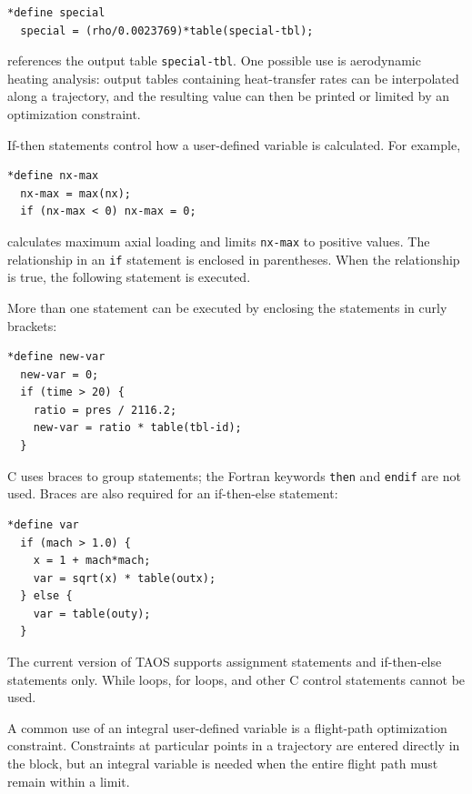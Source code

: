 \begin{lstlisting}[style=taosmanual]
*define special
  special = (rho/0.0023769)*table(special-tbl);
\end{lstlisting}

references the output table \texttt{special-tbl}. One possible use is aerodynamic
heating analysis: output tables containing heat-transfer rates can be interpolated
along a trajectory, and the resulting value can then be printed or limited by an
optimization constraint.

If-then statements control how a user-defined variable is calculated. For example,

\begin{lstlisting}[style=taosmanual]
*define nx-max
  nx-max = max(nx);
  if (nx-max < 0) nx-max = 0;
\end{lstlisting}

calculates maximum axial loading and limits \texttt{nx-max} to positive values. The
relationship in an \texttt{if} statement is enclosed in parentheses. When the
relationship is true, the following statement is executed.

More than one statement can be executed by enclosing the statements in curly
brackets:

\begin{lstlisting}[style=taosmanual]
*define new-var
  new-var = 0;
  if (time > 20) {
    ratio = pres / 2116.2;
    new-var = ratio * table(tbl-id);
  }
\end{lstlisting}

C uses braces to group statements; the Fortran keywords \texttt{then} and
\texttt{endif} are not used. Braces are also required for an if-then-else statement:

\begin{lstlisting}[style=taosmanual]
*define var
  if (mach > 1.0) {
    x = 1 + mach*mach;
    var = sqrt(x) * table(outx);
  } else {
    var = table(outy);
  }
\end{lstlisting}

The current version of TAOS supports assignment statements and if-then-else
statements only. While loops, for loops, and other C control statements cannot be
used.


A common use of an integral user-defined variable is a flight-path optimization
constraint. Constraints at particular points in a trajectory are entered directly in the
 block, but an integral variable is needed when the entire
flight path must remain within a limit.

